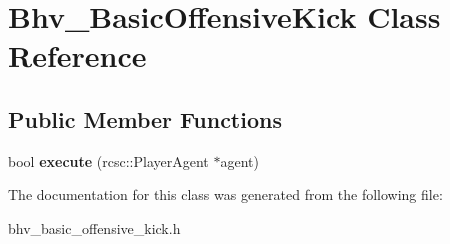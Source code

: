 \hypertarget{classBhv__BasicOffensiveKick}{
\section{Bhv\_\-BasicOffensiveKick Class Reference}
\label{classBhv__BasicOffensiveKick}
}
\subsection*{Public Member Functions}
\begin{DoxyCompactItemize}
\item 
\hypertarget{classBhv__BasicOffensiveKick_adb21d943fde43b41b3db1762665d85bb}{
bool {\bfseries execute} (rcsc::PlayerAgent $\ast$agent)}
\label{classBhv__BasicOffensiveKick_adb21d943fde43b41b3db1762665d85bb}

\end{DoxyCompactItemize}


The documentation for this class was generated from the following file:\begin{DoxyCompactItemize}
\item 
bhv\_\-basic\_\-offensive\_\-kick.h\end{DoxyCompactItemize}
